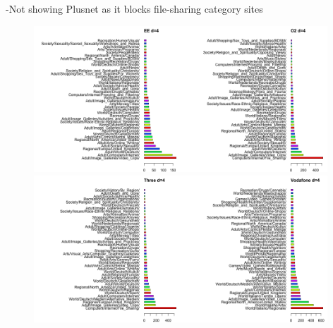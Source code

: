 \documentclass{bmcart}
\begin{document}
-Not showing Plusnet as it blocks file-sharing category sites

\begin{figure}[h!]
\caption{}
\includegraphics[width=0.49\textwidth]{imgs/EE-d-4-blocked-categories-to-date.png}\includegraphics[width=0.49\textwidth]{imgs/O2-d-4-blocked-categories-to-date.png}
\includegraphics[width=0.49\textwidth]{imgs/Three-d-4-blocked-categories-to-date.png}\includegraphics[width=0.49\textwidth]{imgs/Vodafone-d-4-blocked-categories-to-date.png}
\label{fig:broadband-blocked-categories}
\end{figure}
\end{document}

